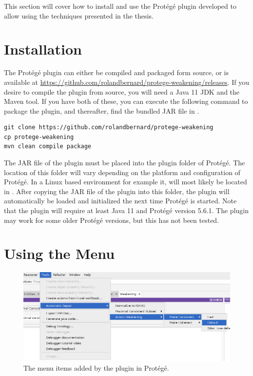 
This section will cover how to install and use the Protégé plugin developed to allow using the techniques presented in the thesis.

\section{Installation}

The Protégé plugin can either be compiled and packaged form source, or is available at \url{https://github.com/rolandbernard/protege-weakening/releases}. If you desire to compile the plugin from source, you will need a Java 11 JDK and the Maven tool. If you have both of these, you can execute the following command to package the plugin, and thereafter, find the bundled JAR file in .

\begin{lstlisting}
git clone https://github.com/rolandbernard/protege-weakening
cp protege-weakening
mvn clean compile package
\end{lstlisting}

The JAR file of the plugin must be placed into the plugin folder of Protégé. The location of this folder will vary depending on the platform and configuration of Protégé. In a Linux based environment for example it, will most likely be located in . After copying the JAR file of the plugin into this folder, the plugin will automatically be loaded and initialized the next time Protégé is started. Note that the plugin will require at least Java 11 and Protégé version 5.6.1. The plugin may work for some older Protégé versions, but this has not been tested.

\section{Using the Menu}

\begin{figure}[htbp]
  \centering
  \includegraphics[width=\textwidth]{resources/protege-guide-menu.png}
  \caption{The menu items added by the plugin in Protégé.}
\end{figure}

